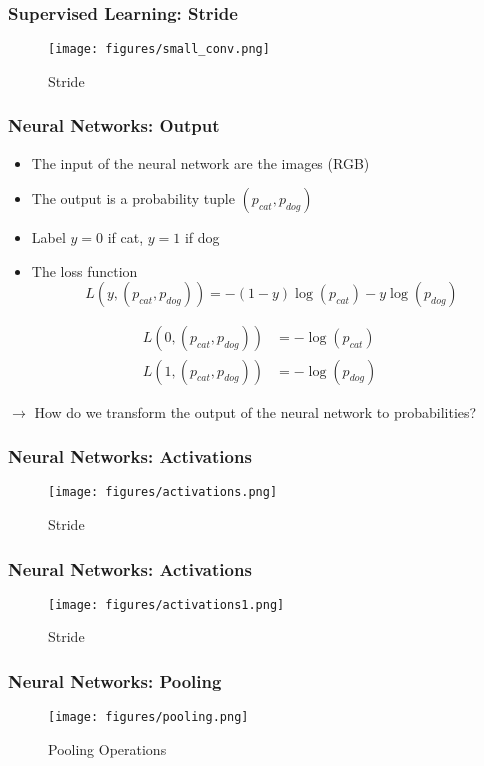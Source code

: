 \documentclass[aspectratio=169]{beamer}
\begin{document}
\begin{frame}
	\frametitle{Supervised Learning: Stride}
	\begin{figure}
		\texttt{[image: figures/small\_conv.png]}
		\caption{Stride}\label{fig:}
	\end{figure}
\end{frame}

\begin{frame}
	\frametitle{Neural Networks: Output}
	\begin{itemize}
		\item The input of the neural network are the images (RGB)
		\item The output is a probability tuple $(p_{cat}, p_{dog})$
		\item Label $y=0$ if cat, $y=1$ if dog
		\item The loss function
		      \[
			      L(y, (p_{cat}, p_{dog})) = -(1-y) \log(p_{cat}) - y \log(p_{dog})
		      \]
	\end{itemize}
	\pause
	\begin{align*}
		L(0, (p_{cat}, p_{dog})) & = -\log(p_{cat}) \\
		L(1, (p_{cat}, p_{dog})) & = -\log(p_{dog})
	\end{align*}

	\pause
	$\rightarrow$ How do we transform the output of the neural network to probabilities?
\end{frame}

\begin{frame}
	\frametitle{Neural Networks: Activations}
	\begin{figure}
		\texttt{[image: figures/activations.png]}
		\caption{Stride}\label{fig:}
	\end{figure}
\end{frame}

\begin{frame}
	\frametitle{Neural Networks: Activations}
	\begin{figure}
		\texttt{[image: figures/activations1.png]}
		\caption{Stride}\label{fig:}
	\end{figure}
\end{frame}

\begin{frame}
	\frametitle{Neural Networks: Pooling}
	\begin{figure}
		\texttt{[image: figures/pooling.png]}
		\caption{Pooling Operations}\label{fig:}
	\end{figure}
\end{frame}
\end{document}
